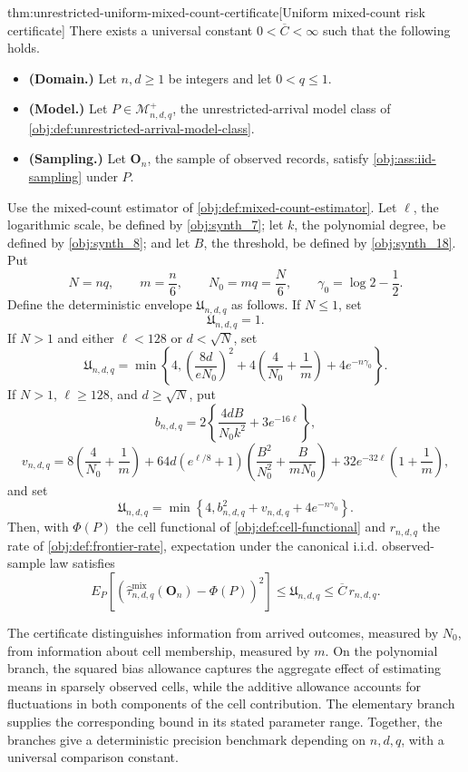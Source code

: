 \begin{theoremv}{thm:unrestricted-uniform-mixed-count-certificate}[Uniform mixed-count risk certificate]
There exists a universal constant \(0<\overline C<\infty\) such that the following holds.
\begin{itemize}
\item \textbf{(Domain.)} Let \(n,d\ge1\) be integers and let \(0<q\le1\).
\item \textbf{(Model.)} Let \(P\in\mathcal M^{+}_{n,d,q}\), the unrestricted-arrival model class of \cref{obj:def:unrestricted-arrival-model-class}.
\item \textbf{(Sampling.)} Let \(\mathbf O_n\), the sample of observed records, satisfy \cref{obj:ass:iid-sampling} under \(P\).
\end{itemize}
Use the mixed-count estimator of \cref{obj:def:mixed-count-estimator}. Let \(\ell\), the logarithmic scale, be defined by \cref{obj:synth_7}; let \(k\), the polynomial degree, be defined by \cref{obj:synth_8}; and let \(B\), the threshold, be defined by \cref{obj:synth_18}. Put
\[
N=nq,\qquad m=\frac n6,\qquad N_0=mq=\frac N6,
\qquad \gamma_0=\log 2-\frac12.
\]
Define the deterministic envelope \(\mathfrak U_{n,d,q}\) as follows. If \(N\le1\), set
\[
\mathfrak U_{n,d,q}=1.
\]
If \(N>1\) and either \(\ell<128\) or \(d<\sqrt N\), set
\[
\mathfrak U_{n,d,q}
=\min\left\{4,
\left(\frac{8d}{eN_0}\right)^2
+4\left(\frac4{N_0}+\frac1m\right)
+4e^{-n\gamma_0}\right\}.
\]
If \(N>1\), \(\ell\ge128\), and \(d\ge\sqrt N\), put
\[
b_{n,d,q}
=2\left\{\frac{4dB}{N_0k^2}+3e^{-16\ell}\right\},
\]
\[
v_{n,d,q}
=8\left(\frac4{N_0}+\frac1m\right)
+64d(e^{\ell/8}+1)
\left(\frac{B^2}{N_0^2}+\frac{B}{mN_0}\right)
+32e^{-32\ell}\left(1+\frac1m\right),
\]
and set
\[
\mathfrak U_{n,d,q}
=\min\left\{4,b_{n,d,q}^2+v_{n,d,q}
+4e^{-n\gamma_0}\right\}.
\]
Then, with \(\Phi(P)\) the cell functional of \cref{obj:def:cell-functional} and \(r_{n,d,q}\) the rate of \cref{obj:def:frontier-rate}, expectation under the canonical i.i.d. observed-sample law satisfies
\[
E_P\!\left[
\left(\widehat\tau^{\mathrm{mix}}_{n,d,q}(\mathbf O_n)-\Phi(P)\right)^2
\right]
\le \mathfrak U_{n,d,q}
\le \overline C\,r_{n,d,q}.
\]
\end{theoremv}

The certificate distinguishes information from arrived outcomes, measured by \(N_0\), from information about cell membership, measured by \(m\). On the polynomial branch, the squared bias allowance captures the aggregate effect of estimating means in sparsely observed cells, while the additive allowance accounts for fluctuations in both components of the cell contribution. The elementary branch supplies the corresponding bound in its stated parameter range. Together, the branches give a deterministic precision benchmark depending on \(n,d,q\), with a universal comparison constant.

